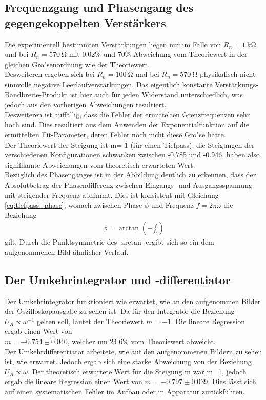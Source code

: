 \documentclass[]{scrartcl}
\begin{document}
\subsection{Frequenzgang und Phasengang des gegengekoppelten Verstärkers}
Die experimentell bestimmten Verstärkungen liegen nur im Falle von $R_n=\SI{1}{\kilo\ohm}$ und bei $R_n=\SI{570}{\ohm}$ mit 0.02\% und 70\% Abweichung vom Theoriewert in der gleichen Grö"senordnung wie der Theoriewert. \\
Desweiteren ergeben sich bei $R_n=\SI{100}{\ohm}$ und bei $R_n=\SI{570}{\ohm}$ physikalisch nicht sinnvolle negative Leerlaufverstärkungen. Das eigentlich konstante Verstärkungs-Bandbreite-Produkt ist hier auch für jeden Widerstand unterschiedlich, was jedoch aus den vorherigen Abweichungen resultiert. \\
Desweiteren ist auffällig, dass die Fehler der ermittelten Grenzfrequenzen sehr hoch sind. Dies resultiert aus dem Anwenden der Exponentialfunktion auf die ermittelten Fit-Parameter, deren Fehler noch nicht diese Grö"se hatte. \\
Der Theoriewert der Steigung ist m=-1 (für einen Tiefpass), die Steigungen der verschiedenen Konfigurationen schwanken zwischen -0.785 und -0.946, haben also signifikante Abweichungen vom theoretisch erwarteten Wert. \\
Bezüglich des Phasenganges ist in der Abbildung deutlich zu erkennen, dass der Absolutbetrag der Phasendifferenz zwischen Eingangs- und Ausgangsspannung mit steigender Frequenz abnimmt. Dies ist konsistent mit Gleichung \ref{eq:tiefpass_phase}, wonach zwischen Phase $\phi$ und Frequenz $f=2\pi\omega$ die Beziehung 
\begin{align*}
\phi=\arctan\left(-\frac{f}{f_g}\right)
\end{align*}
gilt. Durch die Punktsymmetrie des $\arctan$ ergibt sich so ein dem aufgenommenen Bild ähnlicher Verlauf.

\subsection{Der Umkehrintegrator und -differentiator}
Der Umkehrintegrator funktioniert wie erwartet, wie an den aufgenommen Bilder der Oszilloskopausgabe zu sehen ist. Da für den Integrator die Beziehung $U_A\propto\omega^{-1}$ gelten soll, lautet der Theoriewert $m=-1$. Die lineare Regression ergab einen Wert von  \\$m=-0.754\pm0.040$, welcher um 24.6\% vom Theoriewert abweicht. \\
Der Umkehrdifferentiator arbeitete, wie auf den aufgenommenen Bildern zu sehen ist, wie erwartet. Jedoch ergab sich eine starke Abweichung von der Beziehung $U_A\propto\omega$. Der theoretisch erwartete Wert für die Steigung m war m=1, jedoch ergab die lineare Regression einen Wert von $m = -0.797 \pm 0.039$. Dies lässt sich auf einen systematischen Fehler im Aufbau oder in Apparatur zurückführen.
\end{document}

